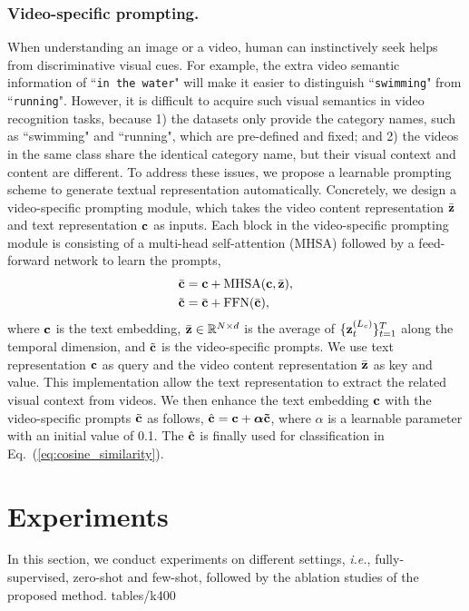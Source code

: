 \documentclass[runningheads]{llncs}
\begin{document}
\subsubsection{Video-specific prompting.} When understanding an image or a video, human can instinctively seek helps from  discriminative visual cues. For example, the extra video semantic information of ``\texttt{in the water}" will make it easier to distinguish ``\texttt{swimming}" from ``\texttt{running}". However, it is difficult to acquire such visual semantics in video recognition tasks, because 1) the datasets only provide the category names, such as ``swimming" and ``running", which are pre-defined and fixed; and 2) the videos in the same class share the identical category name, but their visual context and content are different. To address these issues, we propose a learnable prompting scheme to generate textual representation automatically. Concretely, we design a video-specific prompting module, which takes the video content representation $\bar{\bf{z}}$ and text representation $\bf{c}$ as inputs. Each block in the video-specific prompting module is consisting of a multi-head self-attention (MHSA) \cite{vaswani2017attention} followed by a feed-forward network to learn the prompts,
\begin{equation}
\begin{aligned}
    \bar{\bf{c}} &= {\bf{c}} + \operatorname{\textcolor{black}{MHSA}}({\bf{c}}, \bar{\bf{z}}), \\
    \tilde{\bf{c}} &= \bar{\bf{c}} + \operatorname{FFN}(\bar{\bf{c}}),
\end{aligned}
\end{equation}
where $\bf{c}$ is the text embedding, ${\bar{\bf{z}}} \in \mathbb{R}^{N\times d}$ is the average of $\{{\bf{z}}_{t}^{(L_c)}\}_{t=1}^{T}$ along the temporal dimension, and $\tilde{{\bf{c}}}$ is the video-specific prompts. We use text representation ${\bf{c}}$ as query and the video content representation $\bar{\bf{z}}$ as key and value. This implementation allow the text representation to extract the related visual context from videos. We then enhance the text embedding $\bf{c}$ with the video-specific prompts $\tilde{\bf{c}}$ as follows, $\hat{\bf{c}} = \bf{c} + \boldsymbol \alpha \tilde{\bf{c}}$, where $\alpha$ is a learnable parameter with an initial value of 0.1. The $\hat{\bf{c}}$ is finally used for classification in Eq.~(\ref{eq:cosine_similarity}).

\section{Experiments}
In this section, we conduct experiments on different settings, \emph{i.e.},  fully-supervised, zero-shot and few-shot, followed by the ablation studies of the proposed method.
{tables/k400}
\end{document}
